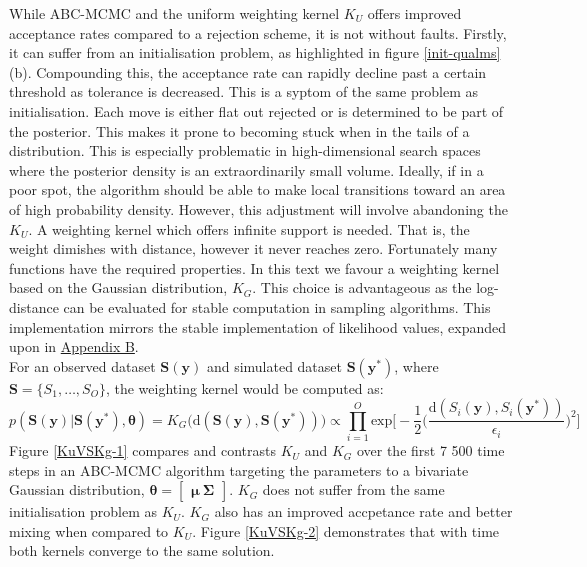 While ABC-MCMC and the uniform weighting kernel $K_U$ offers improved acceptance rates compared to a rejection scheme, it is not without faults. Firstly, it can suffer from an initialisation problem, as highlighted in figure \ref{init-qualms}(b). Compounding this, the acceptance rate can rapidly decline past a certain threshold as tolerance is decreased. This is a syptom of the same problem as initialisation. Each move is either flat out rejected or is determined to be part of the posterior. This makes it prone to becoming stuck when in the tails of a distribution. This is especially problematic in high-dimensional search spaces where the posterior density is an extraordinarily small volume. Ideally, if in a poor spot, the algorithm should be able to make local transitions toward an area of high probability density. However, this adjustment will involve abandoning the $K_U$. A weighting kernel which offers infinite support is needed. That is, the weight dimishes with distance, however it never reaches zero. Fortunately many functions have the required properties. In this text we favour a  weighting kernel based on the Gaussian distribution, $K_G$. This choice is advantageous as the log-distance can be evaluated for stable computation in sampling algorithms. This implementation mirrors the stable implementation of likelihood values, expanded upon in \hyperref[AppendixB]{Appendix B}.\\

For an observed dataset $\bm{S}(\bm{y})$ and simulated dataset $\bm{S}(\bm{y^*})$, where $\bm{S} = \{S_1,\dots,S_O\}$, the weighting kernel would be computed as:
\begin{equation}
p(\bm{S}(\bm{y})|\bm{S}(\bm{y^*}),\bm{\theta}) = K_G\big(\text{d}(\bm{S}(\bm{y}),\bm{S}(\bm{y^*}))\big) \propto \prod_{i = 1}^{O} \text{exp}\Big[-\frac{1}{2}\Big(\frac{\text{d}(S_i(\bm{y}),S_i(\bm{y^*}))}{\epsilon_i}\Big)^2\Big]
\end{equation}
Figure \ref{KuVSKg-1} compares and contrasts $K_U$ and $K_G$ over the first 7 500 time steps in an ABC-MCMC algorithm targeting the parameters to a bivariate Gaussian distribution, $\bm{\theta} = \begin{bmatrix}
\bm{\mu}\ \bm{\Sigma}
\end{bmatrix}$. $K_G$ does not suffer from the same initialisation problem as $K_U$. $K_G$ also has an improved accpetance rate and better mixing when compared to $K_U$. Figure \ref{KuVSKg-2} demonstrates that with time both kernels converge to the same solution.\\

